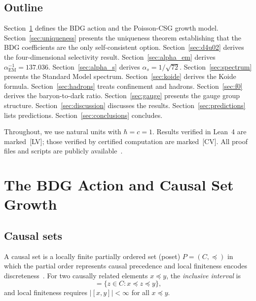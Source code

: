 \documentclass[12pt,a4paper]{article}
\begin{document}
\subsection{Outline}\label{sec:outline}

Section~\ref{sec:bdg} defines the BDG action and the Poisson-CSG growth model. Section~\ref{sec:uniqueness} presents the uniqueness theorem establishing that the BDG coefficients are the only self-consistent option. Section~\ref{sec:d4u02} derives the four-dimensional selectivity result. Section~\ref{sec:alpha_em} derives $\alpha_{\mathrm{EM}}^{-1} = 137.036$. Section~\ref{sec:alpha_s} derives $\alpha_s = 1/\sqrt{72}$. Section~\ref{sec:spectrum} presents the Standard Model spectrum. Section~\ref{sec:koide} derives the Koide formula. Section~\ref{sec:hadrons} treats confinement and hadrons. Section~\ref{sec:f0} derives the baryon-to-dark ratio. Section~\ref{sec:gauge} presents the gauge group structure. Section~\ref{sec:discussion} discusses the results. Section~\ref{sec:predictions} lists predictions. Section~\ref{sec:conclusions} concludes.

Throughout, we use natural units with $\hbar = c = 1$. Results verified in Lean~4 are marked~[LV]; those verified by certified computation are marked~[CV]. All proof files and scripts are publicly available~\cite{GitHub}.

\section{The BDG Action and Causal Set Growth}\label{sec:bdg}

\subsection{Causal sets}\label{sec:causal_sets}

A causal set is a locally finite partially ordered set (poset) $P = (C, \preceq)$ in which the partial order represents causal precedence and local finiteness encodes discreteness~\cite{Bombelli1987}. For two causally related elements $x \preceq y$, the \emph{inclusive interval} is
\begin{equation}
[x,y] = \{z \in C : x \preceq z \preceq y\},
\label{eq:interval}
\end{equation}
and local finiteness requires $|[x,y]| < \infty$ for all $x \preceq y$.
\end{document}
